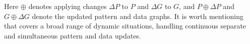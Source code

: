 Here $\oplus$ denotes applying changes $\Delta P$ to $P$ and $\Delta G$ to $G$, and
 $P\oplus\Delta P$ and $G\oplus\Delta G$ denote the updated pattern and data graphs.
 It is worth mentioning that \dynteamF{} covers a broad range of dynamic situations,
\ie handling continuous separate and simultaneous pattern and data updates.





